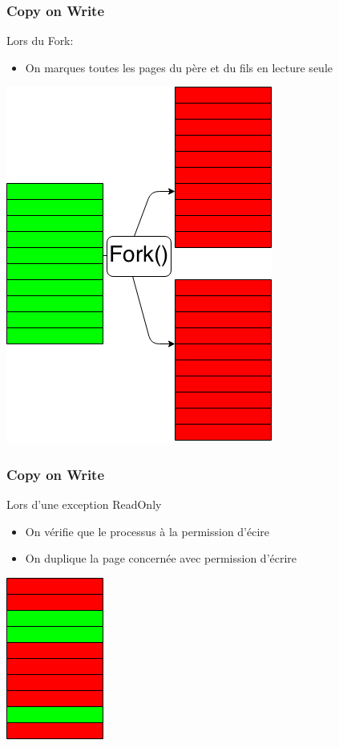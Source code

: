 \documentclass{beamer}
\begin{document}
\begin{frame}
  \frametitle{Copy on Write}
  Lors du Fork:
  \begin{itemize}
    \item On marques toutes les pages du père et du fils en lecture seule
  \end{itemize}

  \begin{center}
  \includegraphics[scale=0.3]{fork_mem.png}
  \end{center}
\end{frame}

\begin{frame}
  \frametitle{Copy on Write}
  Lors d'une exception ReadOnly
  \begin{itemize}
  \item On vérifie que le processus à la permission d'écire
  \item On duplique la page concernée avec permission d'écrire
  \end{itemize}

  \begin{center}
  \includegraphics[scale=0.5]{cow.png}
  \end{center}
\end{frame}
\end{document}
